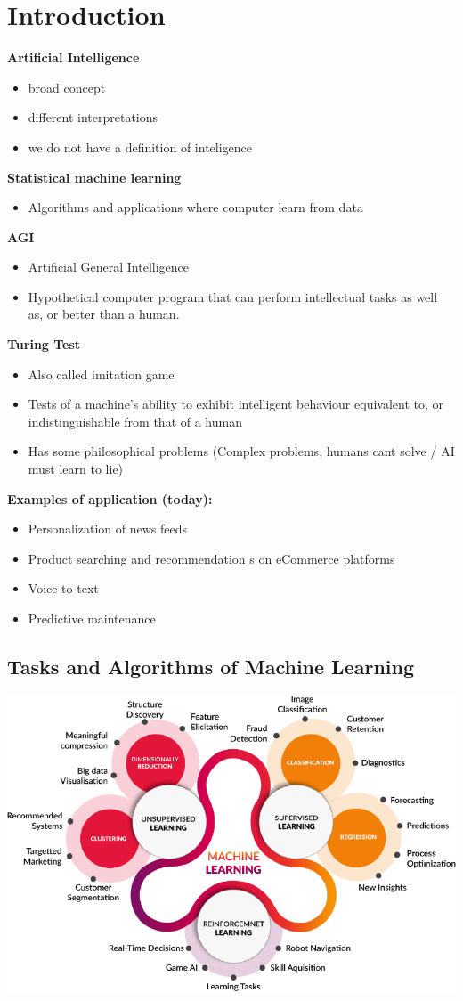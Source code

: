 \section{Introduction}
\textbf{Artificial Intelligence}
\begin{itemize}
    \item broad concept
    \item different interpretations
    \item we do not have a definition of inteligence
\end{itemize}
\textbf{Statistical machine learning}
\begin{itemize}
    \item Algorithms and applications where computer learn from data
\end{itemize}
\textbf{AGI}
\begin{itemize}
    \item Artificial General Intelligence
    \item Hypothetical computer program that can perform intellectual tasks as well as, or better than a human.
\end{itemize}
\textbf{Turing Test}
\begin{itemize}
    \item Also called imitation game
    \item Tests of a machine's ability to exhibit intelligent behaviour equivalent to, or indistinguishable from that of a human
    \item Has some philosophical problems (Complex problems, humans cant solve / AI must learn to lie)
\end{itemize}
\textbf{Examples of application (today):}
\begin{itemize}
    \item Personalization of news feeds
    \item Product searching and recommendation s on eCommerce platforms
    \item Voice-to-text
    \item Predictive maintenance
\end{itemize}
\subsection{Tasks and Algorithms of Machine Learning}
\includegraphics[width=\linewidth]{./img/machine_learning_sections.png}

